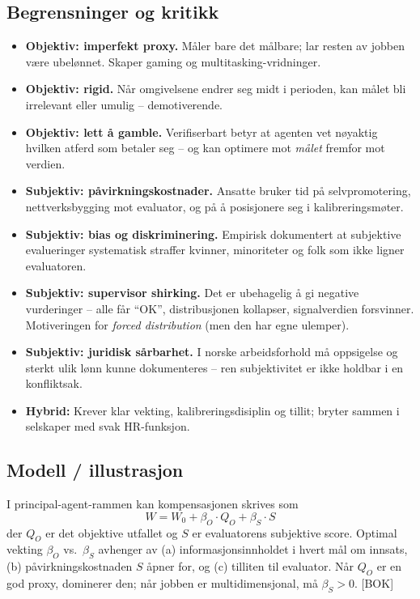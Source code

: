\subsection*{Begrensninger og kritikk}
\begin{itemize}
\item \textbf{Objektiv: imperfekt proxy.} Måler bare det målbare; lar resten av jobben være ubelønnet. Skaper gaming og multitasking-vridninger.
\item \textbf{Objektiv: rigid.} Når omgivelsene endrer seg midt i perioden, kan målet bli irrelevant eller umulig -- demotiverende.
\item \textbf{Objektiv: lett å gamble.} Verifiserbart betyr at agenten vet nøyaktig hvilken atferd som betaler seg -- og kan optimere mot \emph{målet} fremfor mot verdien.
\item \textbf{Subjektiv: påvirkningskostnader.} Ansatte bruker tid på selvpromotering, nettverksbygging mot evaluator, og på å posisjonere seg i kalibreringsmøter.
\item \textbf{Subjektiv: bias og diskriminering.} Empirisk dokumentert at subjektive evalueringer systematisk straffer kvinner, minoriteter og folk som ikke ligner evaluatoren.
\item \textbf{Subjektiv: supervisor shirking.} Det er ubehagelig å gi negative vurderinger -- alle får ``OK'', distribusjonen kollapser, signalverdien forsvinner. Motiveringen for \emph{forced distribution} (men den har egne ulemper).
\item \textbf{Subjektiv: juridisk sårbarhet.} I norske arbeidsforhold må oppsigelse og sterkt ulik lønn kunne dokumenteres -- ren subjektivitet er ikke holdbar i en konfliktsak.
\item \textbf{Hybrid:} Krever klar vekting, kalibreringsdisiplin og tillit; bryter sammen i selskaper med svak HR-funksjon.
\end{itemize}

\subsection*{Modell / illustrasjon}

I principal-agent-rammen kan kompensasjonen skrives som
\[ W = W_0 + \beta_O \cdot Q_O + \beta_S \cdot S \]
der $Q_O$ er det objektive utfallet og $S$ er evaluatorens subjektive score. Optimal vekting $\beta_O$ vs.\ $\beta_S$ avhenger av (a) informasjonsinnholdet i hvert mål om innsats, (b) påvirkningskostnaden $S$ åpner for, og (c) tilliten til evaluator. Når $Q_O$ er en god proxy, dominerer den; når jobben er multidimensjonal, må $\beta_S > 0$. [BOK]

